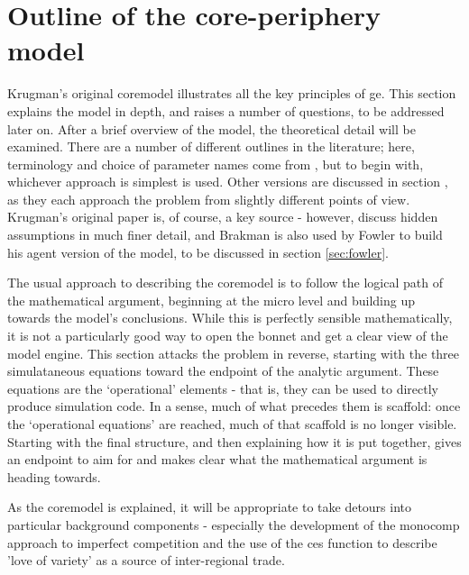 \section{Outline of the core-periphery model \label{sec:core_outline}}

Krugman's original \gls{coremodel} illustrates all the key principles of \gls{ge}. This section explains the model in depth, and raises a number of questions, to be addressed later on. After a brief overview of the model, the theoretical detail will be examined. There are a number of different outlines in the literature; here, terminology and choice of parameter names come from \citeauthor{brakman_new_2009}, but to begin with, whichever approach is simplest is used. Other versions are discussed in section , as they each approach the problem from slightly different points of view. Krugman's original paper \citep{krugman_increasing_1991} is, of course, a key source - however, \citeauthor{brakman_new_2009} discuss hidden assumptions in much finer detail, and Brakman is also used by Fowler to build his agent version of the model, to be discussed in section \ref{sec:fowler}.

The usual approach to describing the \gls{coremodel} is to follow the logical path of the mathematical argument, beginning at the micro level and building up towards the model's conclusions. While this is perfectly sensible mathematically, it is not a particularly good way to open the bonnet and get a clear view of the model engine. This section attacks the problem in reverse, starting with the three simulataneous equations toward the endpoint of the analytic argument. These equations are the `operational' elements - that is, they can be used to directly produce simulation code. In a sense, much of what precedes them is scaffold: once the `operational equations' are reached, much of that scaffold is no longer visible. Starting with the final structure, and then explaining how it is put together, gives an endpoint to aim for and makes clear what the mathematical argument is heading towards.

As the \gls{coremodel} is explained, it will be appropriate to take detours into particular background components - especially the development of the \gls{monocomp} approach to imperfect competition and the use of the \gls{ces} function to describe 'love of variety' as a source of inter-regional trade.

